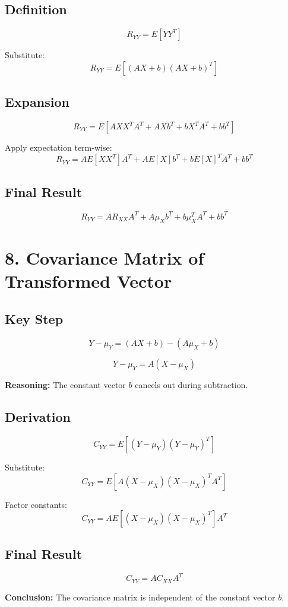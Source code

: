 \documentclass{article}
\begin{document}
\subsection*{Definition}
\[
R_{YY} = E[YY^T]
\]

Substitute:
\[
R_{YY} = E[(AX + b)(AX + b)^T]
\]

\subsection*{Expansion}
\[
R_{YY} = E[AXX^TA^T + AXb^T + bX^TA^T + bb^T]
\]

Apply expectation term-wise:
\[
R_{YY} = A E[XX^T] A^T + A E[X] b^T + b E[X]^T A^T + bb^T
\]

\subsection*{Final Result}
\[
R_{YY} = A R_{XX} A^T + A\mu_X b^T + b\mu_X^T A^T + bb^T
\]

\section*{8. Covariance Matrix of Transformed Vector}

\subsection*{Key Step}
\[
Y - \mu_Y = (AX + b) - (A\mu_X + b)
\]

\[
Y - \mu_Y = A(X - \mu_X)
\]

\textbf{Reasoning:}  
The constant vector $b$ cancels out during subtraction.

\subsection*{Derivation}
\[
C_{YY} = E[(Y - \mu_Y)(Y - \mu_Y)^T]
\]

Substitute:
\[
C_{YY} = E[A(X - \mu_X)(X - \mu_X)^T A^T]
\]

Factor constants:
\[
C_{YY} = A E[(X - \mu_X)(X - \mu_X)^T] A^T
\]

\subsection*{Final Result}
\[
C_{YY} = A C_{XX} A^T
\]

\textbf{Conclusion:}  
The covariance matrix is independent of the constant vector $b$.
\end{document}
